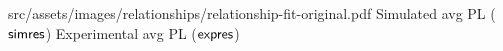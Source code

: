 
\relatplot
{src/assets/images/relationships/relationship-fit-original.pdf}
{Simulated avg PL ($\mathsf{simres}$)}
{Experimental avg PL ($\mathsf{expres}$)}